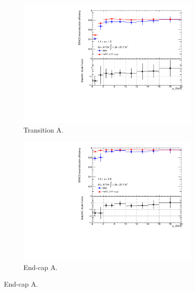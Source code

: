 \begin{figure}[htbp]
    \begin{subfigure}[b]{0.45\textwidth}
      \includegraphics[width=\textwidth]{PartCalibration2012/Plots/SFPlots/Transition_A_reco.pdf}
      \caption{Transition A.} \label{fig:CalibrationRecoSFTransitionA}
    \end{subfigure}
    \hfill
    \begin{subfigure}[b]{0.45\textwidth}
      \includegraphics[width=\textwidth]{PartCalibration2012/Plots/SFPlots/Endcap_A_reco.pdf}
      \caption{End-cap A.} \label{fig:CalibrationRecoSFEndcapA}
    \end{subfigure}


\end{figure}
